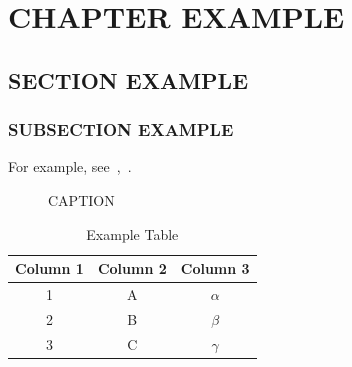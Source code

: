 
\chapter{CHAPTER EXAMPLE}\label{chap:1}

\section{SECTION EXAMPLE}\label{sec:1}

\subsection{SUBSECTION EXAMPLE}\label{subsec:1.1}

For example, see~\cite{EXAMPLE},~\cite{EXAMPLE2}.

\begin{figure}[ht!]
    \centering
    
    \caption{CAPTION}
\end{figure}\label{fig:example}

\begin{table}[ht!]
    \centering
    \begin{tabular}{|c|c|c|}
        \hline
        Column 1 & Column 2 & Column 3 \\
        \hline
        1 & A & $\alpha$ \\
        2 & B & $\beta$ \\
        3 & C & $\gamma$ \\
        \hline
    \end{tabular}
    \caption{Example Table}
    \label{tab:example}
\end{table}

\lipsum[3-5]
